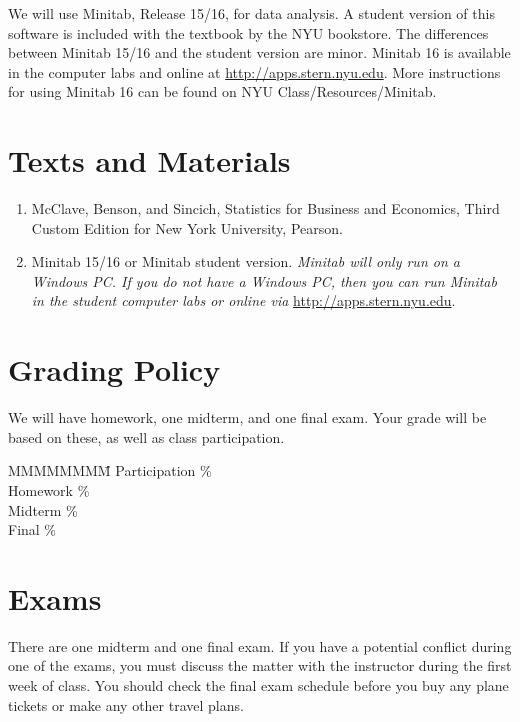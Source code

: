 \documentclass[11pt]{article}
\begin{document}
We will use Minitab, Release 15/16, for data analysis. A student version of
this software is included with the textbook by the NYU bookstore. 
The differences between Minitab 15/16 and the student version are minor.
Minitab 16 is available in the computer labs and online at
\url{http://apps.stern.nyu.edu}. More instructions for using Minitab 16 can be found
on NYU Class/Resources/Minitab. 

\section*{Texts and Materials}

\begin{enumerate}

    \item McClave, Benson, and Sincich, Statistics for Business and Economics,
  Third Custom Edition for New York University, Pearson.  
    \item Minitab 15/16 or Minitab student version.  \emph{Minitab will only run on a Windows PC.  If you do not have a
  Windows PC, then you can run Minitab in the student computer labs or
  online via }\url{http://apps.stern.nyu.edu}.

\end{enumerate}

\section*{Grading Policy}

We will have homework, one midterm, and one final exam. Your grade
will be based on these, as well as class participation.

\begin{tabbing}
  MMMMMMMM\= \kill
Participation \% \\
  Homework  \% \\
  Midterm   \% \\
  Final     \%
\end{tabbing}


\section*{Exams}

There are one midterm and one final exam.  If you have a potential conflict
during one of the exams, you must discuss the matter with the instructor
during the first week of class.  You should check the final exam
schedule before you buy any plane tickets or make any other travel plans.
\end{document}
